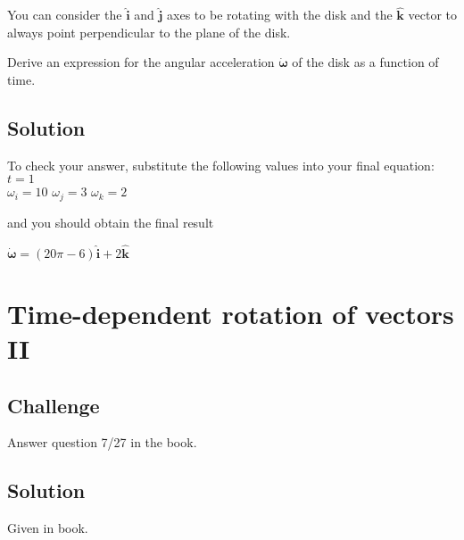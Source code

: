 You can consider the $\bm{\hat{i}}$ and $\bm{\hat{j}}$ axes to be rotating with the disk and the $\bm{\hat{k}}$ vector to always point perpendicular to the plane of the disk. 

Derive an expression for the angular acceleration $\bm{\dot{\omega}}$ of the disk as a function of time.


\subsection*{Solution}
To check your answer, substitute the following values into your final equation:
$t=1$\\
$\omega_i=10$
$\omega_j=3$
$\omega_k=2$

and you should obtain the final result

$\bm{\dot{\omega}} = (20 \pi - 6) \bm{\hat{i}} + 2 \bm{\hat{k}}$




\newpage
\section{Time-dependent rotation of vectors II}

\subsection*{Challenge}
Answer question 7/27 in the book.

\subsection*{Solution}
Given in book.
